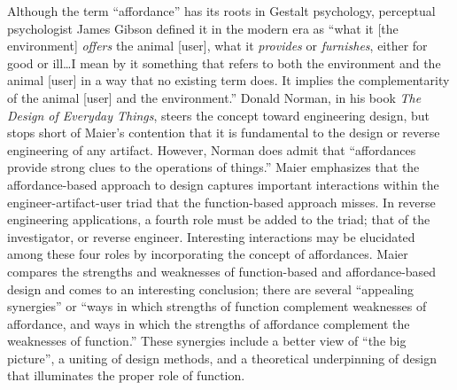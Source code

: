 Although the term “affordance” has its roots in Gestalt
psychology\citep{koffka1935}, perceptual psychologist James Gibson
defined it in the modern era as “what it [the environment]
\textit{offers} the animal [user], what it \textit{provides} or
\textit{furnishes}, either for good or ill…I mean by it something that
refers to both the environment and the animal [user] in a way that no
existing term does. It implies the complementarity of the animal [user]
and the environment.”\citep[][pg. 127]{gibson1979} Donald Norman, in his book
\textit{The Design of Everyday Things}\citep{norman1988}, steers the
concept toward engineering design, but stops short of Maier’s
contention that it is fundamental to the design or reverse engineering
of any artifact. However, Norman does admit that “affordances provide
strong clues to the operations of things.” Maier emphasizes that the
affordance-based approach to design captures important interactions
within the engineer-artifact-user triad that the function-based
approach misses. In reverse engineering applications, a fourth role
must be added to the triad; that of the investigator, or reverse
engineer. Interesting interactions may be elucidated among these four
roles by incorporating the concept of affordances. Maier compares the
strengths and weaknesses of function-based and affordance-based design
and comes to an interesting conclusion; there are several “appealing
synergies” or “ways in which strengths of function complement
weaknesses of affordance, and ways in which the strengths of affordance
complement the weaknesses of function.”\citep{maierfadel2002} These
synergies include a better view of “the big picture”, a uniting of
design methods, and a theoretical underpinning of design that
illuminates the proper role of function.

